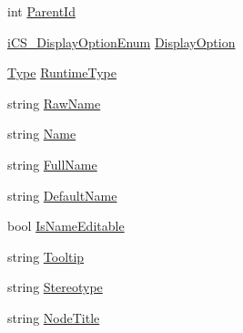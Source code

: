 \begin{DoxyCompactItemize}
\item 
int \hyperlink{classi_c_s___editor_object_adcd715c7c331db648d603821d47946ab}{Parent\+Id}
\item 
\hyperlink{i_c_s___display_option_enum_8cs_adb6e65ba3359480d9b92851d847e9e1e}{i\+C\+S\+\_\+\+Display\+Option\+Enum} \hyperlink{classi_c_s___editor_object_aaf44013e386bde8f1827c93f38967169}{Display\+Option}
\item 
\hyperlink{i_c_s___object_type_enum_8cs_ae6c3dd6d8597380b56d94908eb431547aa1fa27779242b4902f7ae3bdd5c6d508}{Type} \hyperlink{classi_c_s___editor_object_a81ad56a019122d21c1fa600cd20cff80}{Runtime\+Type}
\item 
string \hyperlink{classi_c_s___editor_object_a55e83715a61b25c738fc914cfdcb4966}{Raw\+Name}
\item 
string \hyperlink{classi_c_s___editor_object_a8e4c031a5a6bae5851c370cce4b92f87}{Name}
\item 
string \hyperlink{classi_c_s___editor_object_a8b3877538c0493d1ab89ae44489112f6}{Full\+Name}
\item 
string \hyperlink{classi_c_s___editor_object_a3c4dcc458bf68f52a994dad6d4d66ea7}{Default\+Name}
\item 
bool \hyperlink{classi_c_s___editor_object_afd857ab309e4116f03ea6b9c0a5db497}{Is\+Name\+Editable}
\item 
string \hyperlink{classi_c_s___editor_object_a0973393c51a26df00b6e8f75b209ffb4}{Tooltip}
\item 
string \hyperlink{classi_c_s___editor_object_aa54b2302d1b859231502b37e371fbb3c}{Stereotype}
\item 
string \hyperlink{classi_c_s___editor_object_aa6b4846da58ca2c918314bfcf4d1effd}{Node\+Title}

\end{DoxyCompactItemize}
